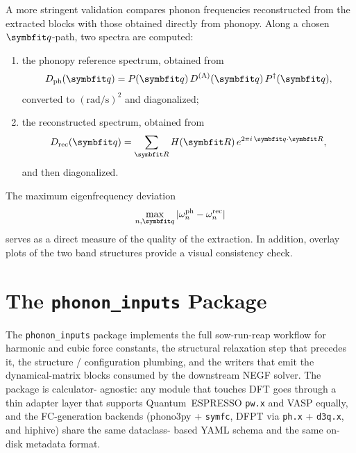 A more stringent validation compares phonon frequencies reconstructed
from the extracted blocks with those obtained directly from phonopy.
Along a chosen $\vc{q}$-path, two spectra are computed:
\begin{enumerate}
  \item the phonopy reference spectrum, obtained from
        \begin{equation}
          D_\mathrm{ph}(\vc{q})
          = P(\vc{q})\,D^{(\mathrm{A})}(\vc{q})\,P^\dagger(\vc{q}),
        \end{equation}
        converted to $(\mathrm{rad/s})^2$ and diagonalized;

  \item the reconstructed spectrum, obtained from
        \begin{equation}
          D_\mathrm{rec}(\vc{q})
          = \sum_{\vc{R}} H(\vc{R})\,
            e^{2\pi i\,\vc{q}\cdot\vc{R}},
        \end{equation}
        and then diagonalized.
\end{enumerate}
The maximum eigenfrequency deviation
\begin{equation}
  \max_{n,\vc{q}}
  |\omega_n^\mathrm{ph} - \omega_n^\mathrm{rec}|
\end{equation}
serves as a direct measure of the quality of the extraction.  In
addition, overlay plots of the two band structures provide a visual
consistency check.

\section{The \texttt{phonon\_inputs} Package}
\label{sec:phonon_inputs_pkg}

The \texttt{phonon\_inputs} package implements the full sow-run-reap
workflow for harmonic and cubic force constants, the structural
relaxation step that precedes it, the structure / configuration
plumbing, and the writers that emit the dynamical-matrix blocks
consumed by the downstream NEGF solver.  The package is calculator-
agnostic: any module that touches DFT goes through a thin adapter
layer that supports Quantum~ESPRESSO \texttt{pw.x} and VASP equally,
and the FC-generation backends (phono3py + \texttt{symfc}, DFPT via
\texttt{ph.x} + \texttt{d3q.x}, and hiphive) share the same dataclass-
based YAML schema and the same on-disk metadata format.

